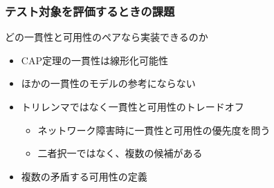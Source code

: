 \documentclass[unicode, 14pt, aspectratio=169]{beamer}
\begin{document}
\begin{frame}
  \frametitle{テスト対象を評価するときの課題}
  {\large どの一貫性と可用性のペアなら実装できるのか}
  \vspace{8pt}
  \begin{description}[font=\normalfont\underline,leftmargin=0.8cm]
  \item[{\large CAP定理の問題}]
  \begin{itemize}[leftmargin=0cm,topsep=0pt,before=\leavevmode\vspace{8pt}]
  \item CAP定理\supercite{cap}の一貫性は線形化可能性\supercite{linearizability} 
  \item ほかの一貫性のモデルの参考にならない
  \item トリレンマではなく一貫性と可用性のトレードオフ\supercite{cap-twelve-years-later}
    \begin{itemize}
    \item ネットワーク障害時に一貫性と可用性の優先度を問う
    \item 二者択一ではなく、複数の候補がある
    \end{itemize}
  \item 複数の矛盾する可用性の定義\supercite{kleppmann}    
  \end{itemize}    
  \end{description}

\end{frame}
\end{document}
